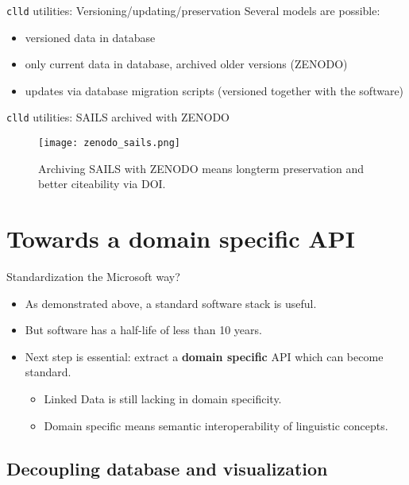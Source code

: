 \documentclass{beamer}
\begin{document}
\begin{frame}{\texttt{clld} utilities: Versioning/updating/preservation}
Several models are possible:
\begin{itemize}
\item versioned data in database
\item only current data in database, archived older versions (ZENODO)
\item updates via database migration scripts (versioned together with the software)
\end{itemize}
\end{frame}

\begin{frame}{\texttt{clld} utilities: SAILS archived with ZENODO}
\begin{figure}
\texttt{[image: zenodo\_sails.png]}
\caption{\label{fig:zenodo}Archiving SAILS with ZENODO means longterm preservation and
better citeability via DOI.}
\end{figure}
\end{frame}


\section{Towards a domain specific API}

\begin{frame}{Standardization the Microsoft way?}
\begin{itemize}
\item As demonstrated above, a standard software stack is useful.
\item But software has a half-life of less than 10 years.
\item Next step is essential: extract a \textbf{domain specific} API which can become standard.
\begin{itemize}
\item Linked Data is still lacking in domain specificity.
\item Domain specific means semantic interoperability of linguistic concepts.
\end{itemize}
\end{itemize}
\end{frame}


\subsection{Decoupling database and visualization}
\end{document}
